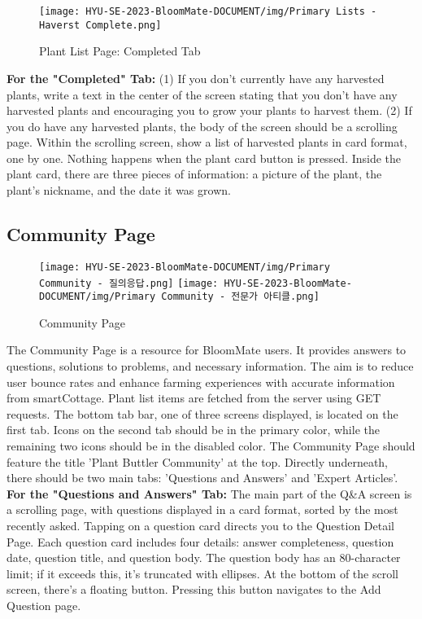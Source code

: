 \documentclass[conference, a4paper]{IEEEtran}
\begin{document}
    \begin{figure}[h]
    \centering
    \texttt{[image: HYU-SE-2023-BloomMate-DOCUMENT/img/Primary Lists - Haverst Complete.png]}
    \label{fig}
    \caption{Plant List Page: Completed Tab}
    \end{figure}
    
\textbf{For the "Completed" Tab:}
    (1) If you don't currently have any harvested plants, write a text in the center of the screen stating that you don't have any harvested plants and encouraging you to grow your plants to harvest them. (2) If you do have any harvested plants, the body of the screen should be a scrolling page. Within the scrolling screen, show a list of harvested plants in card format, one by one. Nothing happens when the plant card button is pressed. Inside the plant card, there are three pieces of information: a picture of the plant, the plant's nickname, and the date it was grown.


\subsection{Community Page}
    \begin{figure}[h]
    \centerline{
        \texttt{[image: HYU-SE-2023-BloomMate-DOCUMENT/img/Primary Community - 질의응답.png]}
        \texttt{[image: HYU-SE-2023-BloomMate-DOCUMENT/img/Primary Community - 전문가 아티클.png]}
    }
    \label{fig}
    \caption{Community Page}
    \end{figure}
The Community Page is a resource for BloomMate users. It provides answers to questions, solutions to problems, and necessary information. The aim is to reduce user bounce rates and enhance farming experiences with accurate information from smartCottage. Plant list items are fetched from the server using GET requests. The bottom tab bar, one of three screens displayed, is located on the first tab. Icons on the second tab should be in the primary color, while the remaining two icons should be in the disabled color. The Community Page should feature the title 'Plant Buttler Community' at the top. Directly underneath, there should be two main tabs: 'Questions and Answers' and 'Expert Articles'.\\

\textbf{For the "Questions and Answers" Tab: } The main part of the Q\&A screen is a scrolling page, with questions displayed in a card format, sorted by the most recently asked. Tapping on a question card directs you to the Question Detail Page. Each question card includes four details: answer completeness, question date, question title, and question body. The question body has an 80-character limit; if it exceeds this, it's truncated with ellipses. At the bottom of the scroll screen, there's a floating button. Pressing this button navigates to the Add Question page.\\
\end{document}
